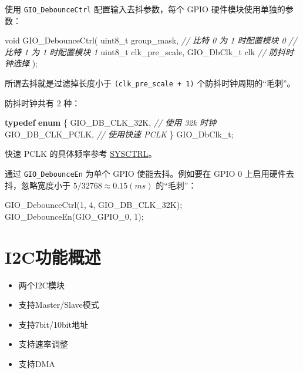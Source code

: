 \documentclass[
  12pt,
]{book}
\newenvironment{Shaded}{\begin{snugshade}}{\end{snugshade}}
\newcommand{\CommentTok}[1]{\textcolor[rgb]{0.56,0.35,0.01}{\textit{#1}}}
\newcommand{\DataTypeTok}[1]{\textcolor[rgb]{0.13,0.29,0.53}{#1}}
\newcommand{\DecValTok}[1]{\textcolor[rgb]{0.00,0.00,0.81}{#1}}
\newcommand{\KeywordTok}[1]{\textcolor[rgb]{0.13,0.29,0.53}{\textbf{#1}}}
\newcommand{\NormalTok}[1]{#1}
\providecommand{\tightlist}{%
  \setlength{\itemsep}{0pt}\setlength{\parskip}{0pt}}
\begin{document}
使用 \texttt{GIO\_DebounceCtrl} 配置输入去抖参数，每个 GPIO 硬件模块使用单独的参数：

\begin{Shaded}
\begin{Highlighting}[]
\DataTypeTok{void}\NormalTok{ GIO_DebounceCtrl(}
  \DataTypeTok{uint8_t}\NormalTok{ group_mask,     }\CommentTok{// 比特 0 为 1 时配置模块 0}
                          \CommentTok{// 比特 1 为 1 时配置模块 1}
  \DataTypeTok{uint8_t}\NormalTok{ clk_pre_scale,}
\NormalTok{  GIO_DbClk_t clk         }\CommentTok{// 防抖时钟选择}
\NormalTok{  );}
\end{Highlighting}
\end{Shaded}

所谓去抖就是过滤掉长度小于 \texttt{(clk\_pre\_scale\ +\ 1)} 个防抖时钟周期的``毛刺''。

防抖时钟共有 2 种：

\begin{Shaded}
\begin{Highlighting}[]
\KeywordTok{typedef} \KeywordTok{enum}
\NormalTok{\{}
\NormalTok{    GIO_DB_CLK_32K,     }\CommentTok{// 使用 32k 时钟}
\NormalTok{    GIO_DB_CLK_PCLK,    }\CommentTok{// 使用快速 PCLK}
\NormalTok{\} GIO_DbClk_t;}
\end{Highlighting}
\end{Shaded}

快速 PCLK 的具体频率参考 \protect\hyperlink{ch-sysctrl}{SYSCTRL}。

通过 \texttt{GIO\_DebounceEn} 为单个 GPIO 使能去抖。例如要在 GPIO 0 上启用硬件去抖，忽略宽度小于
\(5/32768 \approx 0.15 (ms)\) 的``毛刺''：

\begin{Shaded}
\begin{Highlighting}[]
\NormalTok{GIO_DebounceCtrl(}\DecValTok{1}\NormalTok{, }\DecValTok{4}\NormalTok{, GIO_DB_CLK_32K);}
\NormalTok{GIO_DebounceEn(GIO_GPIO_0, }\DecValTok{1}\NormalTok{);}
\end{Highlighting}
\end{Shaded}

\hypertarget{i2cux529fux80fdux6982ux8ff0}{%
\chapter{I2C功能概述}\label{i2cux529fux80fdux6982ux8ff0}}

\begin{itemize}
\tightlist
\item
  两个I2C模块
\item
  支持Master/Slave模式
\item
  支持7bit/10bit地址
\item
  支持速率调整
\item
  支持DMA
\end{itemize}
\end{document}

